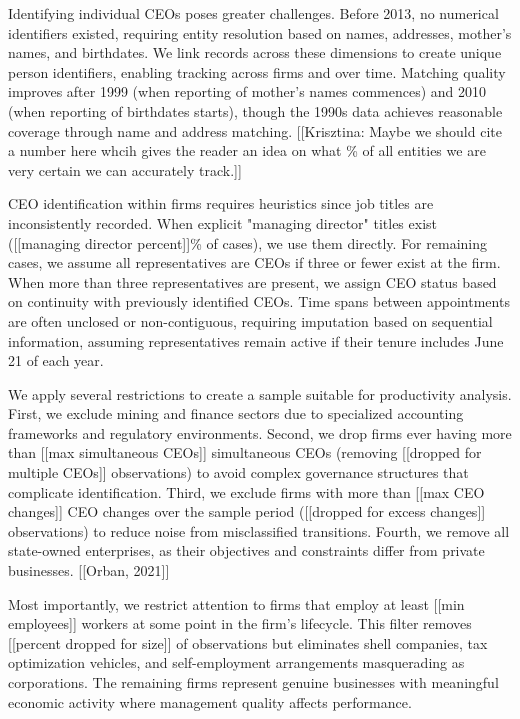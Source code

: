 \documentclass[11pt,a4paper]{article}
\begin{document}
Identifying individual CEOs poses greater challenges. Before 2013, no numerical identifiers existed, requiring entity resolution based on names, addresses, mother's names, and birthdates. We link records across these dimensions to create unique person identifiers, enabling tracking across firms and over time. Matching quality improves after 1999 (when reporting of mother's names commences) and 2010 (when reporting of birthdates starts), though the 1990s data achieves reasonable coverage through name and address matching. [[Krisztina: Maybe we should cite a number here whcih gives the reader an idea on what \% of all entities we are very certain we can accurately track.]]

CEO identification within firms requires heuristics since job titles are inconsistently recorded. When explicit "managing director" titles exist ([[managing director percent]]\% of cases), we use them directly. For remaining cases, we assume all representatives are CEOs if three or fewer exist at the firm. When more than three representatives are present, we assign CEO status based on continuity with previously identified CEOs. Time spans between appointments are often unclosed or non-contiguous, requiring imputation based on sequential information, assuming representatives remain active if their tenure includes June 21 of each year.

We apply several restrictions to create a sample suitable for productivity analysis. First, we exclude mining and finance sectors due to specialized accounting frameworks and regulatory environments. Second, we drop firms ever having more than [[max simultaneous CEOs]] simultaneous CEOs (removing [[dropped for multiple CEOs]] observations) to avoid complex governance structures that complicate identification. Third, we exclude firms with more than [[max CEO changes]] CEO changes over the sample period ([[dropped for excess changes]] observations) to reduce noise from misclassified transitions. Fourth, we remove all state-owned enterprises, as their objectives and constraints differ from private businesses. [[Orban, 2021]]

Most importantly, we restrict attention to firms that employ at least [[min employees]] workers at some point in the firm's lifecycle. This filter removes [[percent dropped for size]] of observations but eliminates shell companies, tax optimization vehicles, and self-employment arrangements masquerading as corporations. The remaining firms represent genuine businesses with meaningful economic activity where management quality affects performance.
\end{document}

